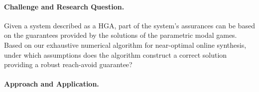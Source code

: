 \documentclass{article}
\begin{document}
\paragraph{Challenge and Research Question.}

Given a system described as a HGA, part of the system's
assurances can be based on the guarantees provided by the solutions of
the parametric modal games.  Based on our exhaustive numerical
algorithm for near-optimal online synthesis, under which assumptions
does the algorithm construct a correct solution providing a robust
reach-avoid guarantee?

\paragraph{Approach and Application.}
\end{document}
